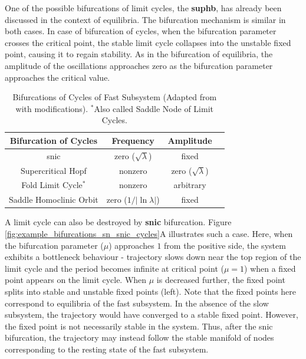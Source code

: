 \documentclass[../main.tex]{subfiles}
\begin{document}
One of the possible bifurcations of limit cycles, the \textbf{\gls{suphb}}, has already been discussed in the context of equilibria. The bifurcation mechanism is similar in both cases. In case of bifurcation of cycles, when the bifurcation parameter crosses the critical point, the stable limit cycle collapses into the unstable fixed point, causing it to regain stability.
As in the bifurcation of equilibria, the amplitude of the oscillations approaches zero as the bifurcation parameter approaches the critical value.

\begin{table}[t!]
    \centering
    \begin{tabular}{|c||c|c|c|}
        \hline
        Bifurcation of Cycles & Frequency & Amplitude \\
        \hline
        \hline
        \gls{snic} & zero ($\sqrt{\lambda}$) & fixed \\
        Supercritical Hopf & nonzero & zero ($\sqrt{\lambda}$) \\
        Fold Limit Cycle$^{*}$ & nonzero & arbitrary \\
        Saddle Homoclinic Orbit & zero ($1/|\ln{\lambda}|$) & fixed \\
        \hline
    \end{tabular}
    \caption[Bifurcations of Cycles of Fast Subsystem]{Bifurcations of Cycles of Fast Subsystem
    (Adapted from \parencite{izhikevichNEURALEXCITABILITYSPIKING2000} with modifications).
    $^{*}$Also called Saddle Node of Limit Cycles.}
    \label{tab:bifurcations_cycles}
\end{table}

A limit cycle can also be destroyed by \textbf{\gls{snic}} bifurcation. Figure \ref{fig:example_bifurcations_sn_snic_cycles}A illustrates such a case. Here, when the bifurcation parameter ($\mu$) approaches $1$ from the positive side, the system exhibits a bottleneck behaviour - trajectory slows down near the top region of the limit cycle and the period becomes infinite at critical point ($\mu=1$) when a fixed point appears on the limit cycle. When $\mu$ is decreased further, the fixed point splits into stable and unstable fixed points (left). Note that the fixed points here correspond to equilibria of the fast subsystem. In the absence of the slow subsystem, the trajectory would have converged to a stable fixed point. However, the fixed point is not necessarily stable in the system. Thus, after the \gls{snic} bifurcation, the trajectory may instead follow the stable manifold of nodes corresponding to the resting state of the fast subsystem.
\end{document}
